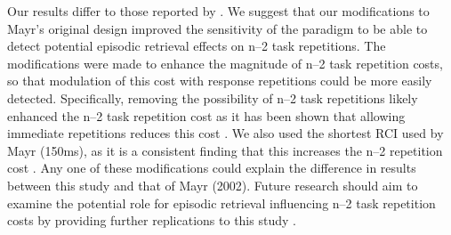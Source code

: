 \documentclass[a4paper, doc, natbib]{apa6}
\begin{document}
Our results differ to those reported by \cite{Mayr2002}. We suggest that our modifications to Mayr's original design improved the sensitivity of the paradigm to be able to detect potential episodic retrieval effects on n--2 task repetitions. The modifications were made to enhance the magnitude of n--2 task repetition costs, so that modulation of this cost with response repetitions could be more easily detected. Specifically, removing the possibility of n--2 task repetitions likely enhanced the n--2 task repetition cost as it has been shown that allowing immediate repetitions reduces this cost \citep{Philipp2006}. We also used the shortest RCI used by Mayr (150ms), as it is a consistent finding that this increases the n--2 repetition cost \cite{Gade2005, Grange2009, Mayr2000, Mayr2002}. Any one of these modifications could explain the difference in results between this study and that of Mayr (2002). Future research should aim to examine the potential role for episodic retrieval influencing n--2 task repetition costs by providing further replications to this study \citep{OpenScienceCollaboration2015}.






\end{document}
